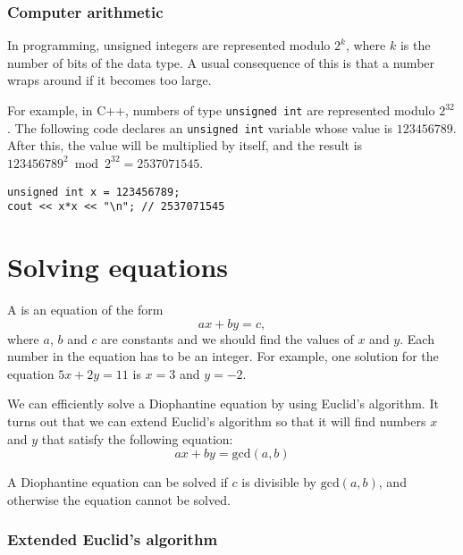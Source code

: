 \subsubsection{Computer arithmetic}

In programming, unsigned integers are represented modulo $2^k$,
where $k$ is the number of bits of the data type.
A usual consequence of this is that a number wraps around
if it becomes too large.

For example, in C++, numbers of type \texttt{unsigned int}
are represented modulo $2^{32}$.
The following code declares an \texttt{unsigned int}
variable whose value is $123456789$.
After this, the value will be multiplied by itself,
and the result is
$123456789^2 \bmod 2^{32} = 2537071545$.

\begin{lstlisting}
unsigned int x = 123456789;
cout << x*x << "\n"; // 2537071545
\end{lstlisting}

\section{Solving equations}


A  is an equation of the form
\[ ax + by = c, \]
where $a$, $b$ and $c$ are constants
and we should find the values of $x$ and $y$.
Each number in the equation has to be an integer.
For example, one solution for the equation
$5x+2y=11$ is $x=3$ and $y=-2$.


We can efficiently solve a Diophantine equation
by using Euclid's algorithm.
It turns out that we can extend Euclid's algorithm
so that it will find numbers $x$ and $y$
that satisfy the following equation:
\[
ax + by = \textrm{gcd}(a,b)
\]

A Diophantine equation can be solved if
$c$ is divisible by
$\textrm{gcd}(a,b)$,
and otherwise the equation cannot be solved.


\subsubsection*{Extended Euclid's algorithm}

